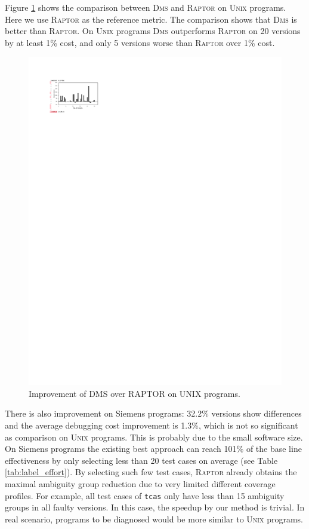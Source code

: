\vspace{0.2cm}
Figure \ref{fig:our_vs_ag_unix} shows the comparison between \textsc{Dms} and \textsc{Raptor} on \textsc{Unix} programs.
Here we use \textsc{Raptor} as the reference metric. The comparison shows that \textsc{Dms} is better than \textsc{Raptor}.
On \textsc{Unix} programs \textsc{Dms} outperforms \textsc{Raptor} on 20 versions by at least 1\% cost,
and only 5 versions worse than \textsc{Raptor} over 1\% cost.

\begin{figure}[!htbp]
    \centering
    \includegraphics[width=12cm]{our_vs_ag_unix.pdf}
    \caption{Improvement of D{\scriptsize MS} over R{\scriptsize APTOR} on U{\scriptsize NIX} programs.}
    \label{fig:our_vs_ag_unix}
\end{figure}

There is also improvement on Siemens programs: 32.2\% versions show differences and the average debugging cost improvement is 1.3\%, which is not so significant as comparison on \textsc{Unix} programs.
This is probably due to the small software size. On Siemens programs the existing best approach
can reach 101\% of the base line effectiveness by only selecting less than 20 test cases on average (see Table \ref{tab:label_effort}).
By selecting such few test cases, \textsc{Raptor} already obtains the maximal ambiguity group reduction due to very limited different
coverage profiles. For example, all test cases of \texttt{tcas} only have less than 15 ambiguity groups in all faulty versions. In this case,
the speedup by our method is trivial. In real scenario, programs to be diagnosed would be more similar to \textsc{Unix} programs.
